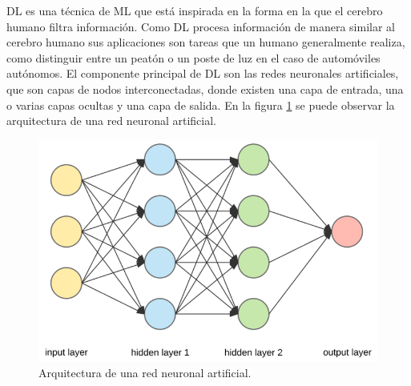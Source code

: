 DL es una técnica de ML  que está inspirada en la forma en la que el cerebro humano filtra información. Como DL procesa información de manera similar al cerebro humano sus aplicaciones son tareas que un humano generalmente realiza, como distinguir entre un peatón o un poste de luz en el caso de automóviles autónomos. El componente principal de DL son las redes neuronales artificiales, que son capas de nodos interconectadas, donde existen una capa de entrada, una o varias capas ocultas y una capa de salida. En la figura \ref{fig:neural_network} se puede observar la arquitectura de una red neuronal artificial.
\begin{figure}[h]
	\centering
	\includegraphics[scale=0.4]{./Figures/neural_network.png}
	\caption{Arquitectura de una red neuronal artificial.}
	\label{fig:neural_network}
\end{figure}

